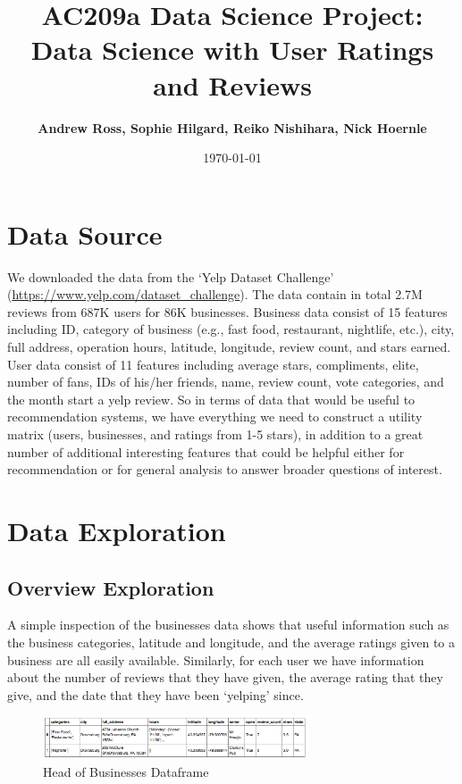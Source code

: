 \documentclass[11pt]{article}
\title{
\vspace{1cm}
\textmd{\textbf{AC209a Data Science Project: Data Science with User Ratings and Reviews}}\\
}
\author{\textbf{Andrew Ross, Sophie Hilgard, Reiko Nishihara, Nick Hoernle}}
\date{\today} %
\begin{document}
\maketitle

\section*{Data Source}

We downloaded the data from the `Yelp Dataset Challenge' (\url{https://www.yelp.com/dataset_challenge}). The data contain in total 2.7M reviews from 687K users for 86K businesses. Business data consist of 15 features including ID, category of business (e.g., fast food, restaurant, nightlife, etc.), city, full address, operation hours, latitude, longitude, review count, and stars earned. User data consist of 11 features including average stars, compliments, elite, number of fans, IDs of his/her friends, name, review count, vote categories, and the month start a yelp review. So in terms of data that would be useful to recommendation systems, we have everything we need to construct a utility matrix (users, businesses, and ratings from 1-5 stars), in addition to a great number of additional interesting features that could be helpful either for recommendation or for general analysis to answer broader questions of interest.

\section*{Data Exploration}

\subsection*{Overview Exploration}

\par A simple inspection of the businesses data shows that useful information such as the business categories, latitude and longitude, and the average ratings given to a business are all easily available. Similarly, for each user we have information about the number of reviews that they have given, the average rating that they give, and the date that they have been `yelping' since.

\begin{figure}[H]
\centering
\includegraphics[width=0.7\textwidth]{./ac209/business-dataframe-simplified.png}
\caption{Head of Businesses Dataframe}
\end{figure}
\end{document}
